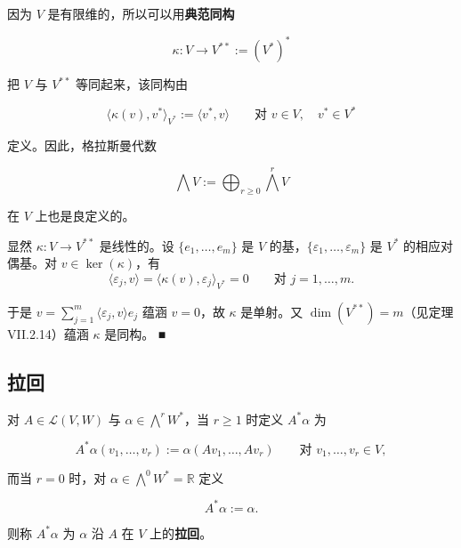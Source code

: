 \begin{remark}

因为 $ V $ 是有限维的，所以可以用\textbf{典范同构}

\[
\kappa : V \to V^{\ast\ast} := (V^{*})^{*}
\]

把 $ V $ 与 $ V^{\ast\ast} $ 等同起来，该同构由

\[
\langle \kappa(v), v^{*}\rangle_{V^{*}} := \langle v^{*}, v\rangle \qquad \text{对 } v \in V , \quad v^{*} \in V^{*}
\]

定义。因此，格拉斯曼代数

\[
\bigwedge V := \bigoplus_{r \ge 0} \bigwedge^{r} V
\]

在 $ V $ 上也是良定义的。

\proofhead
显然 $ \kappa : V \to V^{\ast\ast} $ 是线性的。设 $ \{e_{1},\ldots,e_{m}\} $ 是 $ V $ 的基，$ \{\varepsilon_{1},\ldots,\varepsilon_{m}\} $ 是 $ V^{*} $ 的相应对偶基。对 $ v \in \ker(\kappa) $，有
\[
\langle \varepsilon_{j}, v\rangle = \langle \kappa(v), \varepsilon_{j}\rangle_{V^{*}} = 0 \qquad \text{对 } j = 1,\ldots,m .
\]

于是 $ v = \sum_{j=1}^{m}\langle \varepsilon_{j}, v\rangle e_{j} $ 蕴涵 $ v = 0 $，故 $ \kappa $ 是单射。又 $ \dim(V^{\ast\ast}) = m $（见定理 VII.2.14）蕴涵 $ \kappa $ 是同构。 \nobreak\hspace{0.35em}■

\end{remark}

\subsection*{拉回}

对 $ A \in \mathcal{L}(V,W) $ 与 $ \alpha \in \bigwedge^{r}W^{*} $，当 $ r \ge 1 $ 时定义 $ A^{*}\alpha $ 为

\[
A^{*}\alpha(v_{1},\ldots,v_{r}) := \alpha(Av_{1},\ldots,Av_{r}) \qquad \text{对 } v_{1},\ldots,v_{r} \in V ,
\]

而当 $ r = 0 $ 时，对 $ \alpha \in \bigwedge^{0}W^{*} = \mathbb{R} $ 定义

\[
A^{*}\alpha := \alpha .
\]

则称 $ A^{*}\alpha $ 为 $ \alpha $ 沿 $ A $ 在 $ V $ 上的\textbf{拉回}。

